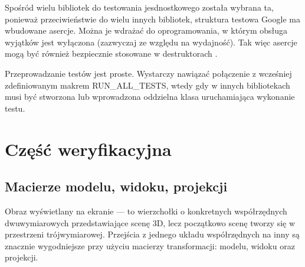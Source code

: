 Spośród wielu bibliotek do testowania jesdnostkowego została wybrana ta, ponieważ przeciwieństwie do wielu innych bibliotek, struktura testowa Google ma wbudowane asercje. Można je wdrażać do oprogramowania, w którym obsługa wyjątków jest wyłączona (zazwyczaj ze względu na wydajność). Tak więc asercje mogą być również bezpiecznie stosowane w destruktorach \cite{ibmGoogle}.

Przeprowadzanie testów jest proste. Wystarczy nawiązać połączenie z wcześniej zdefiniowanym makrem RUN\_ALL\_TESTS, wtedy gdy w innych bibliotekach musi być stworzona lub wprowadzona oddzielna klasa uruchamiająca wykonanie testu. 
\newpage
\section{Część weryfikacyjna}
\subsection{Macierze modelu, widoku, projekcji}
Obraz wyświetlany na ekranie --- to wierzchołki o konkretnych współrzędnych dwuwymiarowych przedstawiające scenę 3D, lecz początkowo scenę tworzy się w przestrzeni trójwymiarowej. Przejścia z jednego układu współrzędnych na inny są znacznie wygodniejsze przy użyciu macierzy transformacji: modelu, widoku oraz projekcji. 

